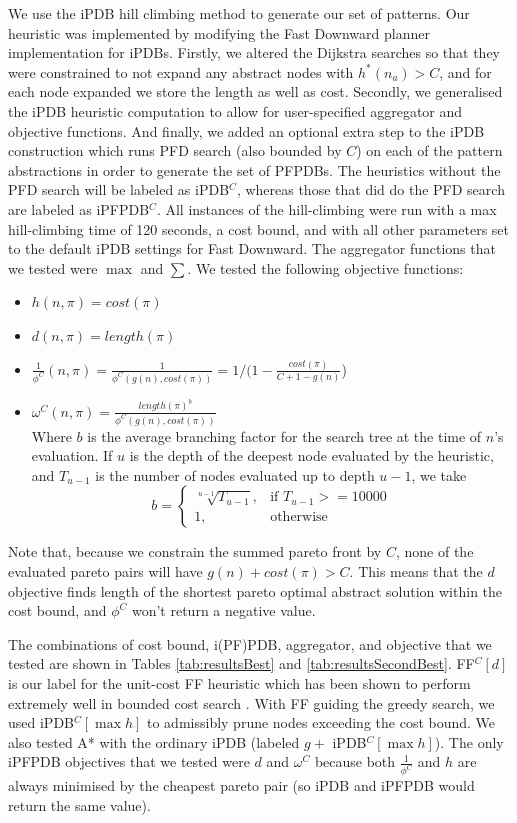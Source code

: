 \documentclass[letterpaper]{article} %
\begin{document}
We use the iPDB hill climbing method \cite{haslum2007domain}
to generate our set of patterns.
Our heuristic was implemented by modifying the Fast Downward planner
implementation for iPDBs.
Firstly, we altered the Dijkstra searches so that
they were constrained to not expand any abstract nodes with \(h^*(n_a) > C\),
and for each node expanded we store the length as well as cost.
Secondly, we generalised the iPDB heuristic computation
to allow for user-specified aggregator and objective functions.
And finally, we added an optional extra step to the iPDB construction
which runs PFD search (also bounded by \(C\)) on each of the pattern abstractions
in order to generate the set of PFPDBs.
The heuristics without the PFD search will be labeled
as iPDB\(^C\), whereas those that did do the PFD search are labeled as iPFPDB\(^C\).
All instances of the hill-climbing were
run with a max hill-climbing time of 120 seconds, a cost bound,
and with all other parameters set to the default iPDB settings for Fast Downward.
The aggregator functions that we tested were \(\max\) and \(\sum\).
We tested the following objective functions:
\begin{itemize}
\item
  \(h(n, \pi) = cost(\pi)\)
\item
  \(d(n, \pi) = length(\pi)\)
\item
  \(\frac{1}{\phi^C}(n, \pi) = \frac{1}{\phi^C(g(n), cost(\pi))} = 1 / (1 - \frac{cost(\pi)}{C+1 - g(n)}\))
\item
  \(\omega^C(n, \pi) = \frac{length(\pi)^b}{\phi^C(g(n), cost(\pi))}\)\\
  Where \(b\) is the average branching factor for the search tree
  at the time of \(n\)'s evaluation. If \(u\) is
  the depth of the deepest node evaluated by the heuristic, and \(T_{u-1}\) is
  the number of nodes evaluated up to depth \(u-1\),
  we take \[b =
  \begin{cases}
    \sqrt[u-1]{T_{u-1}} ,& \text{if } T_{u-1} >= 10000 \\
    1 ,& \text{otherwise}
  \end{cases}
  \]
\end{itemize}
Note that, because we constrain the summed pareto front by \(C\),
none of the evaluated pareto pairs will have \(g(n) + cost(\pi) > C\).
This means that the \(d\) objective finds length of the shortest pareto optimal abstract solution
within the cost bound, and \(\phi^C\) won't return a negative value.

The combinations of cost bound, i(PF)PDB, aggregator, and objective that we tested are shown in Tables \ref{tab:resultsBest} and \ref{tab:resultsSecondBest}.
FF\(^C[d]\) is our label for the unit-cost FF heuristic which has been shown 
to perform extremely well in bounded cost search \cite{haslum2013heuristics}.
With FF guiding the greedy search,
we used iPDB\(^C[\max h]\) to admissibly prune nodes exceeding the cost bound.
We also tested A* with the ordinary iPDB (labeled \(g + \) iPDB\(^C[\max{h}]\)).
The only iPFPDB objectives that we tested were \(d\) and \(\omega^C\)
because both \(\frac{1}{\phi^C}\) and \(h\) are always
minimised by the cheapest pareto pair (so iPDB and iPFPDB would return
the same value).
\end{document}
